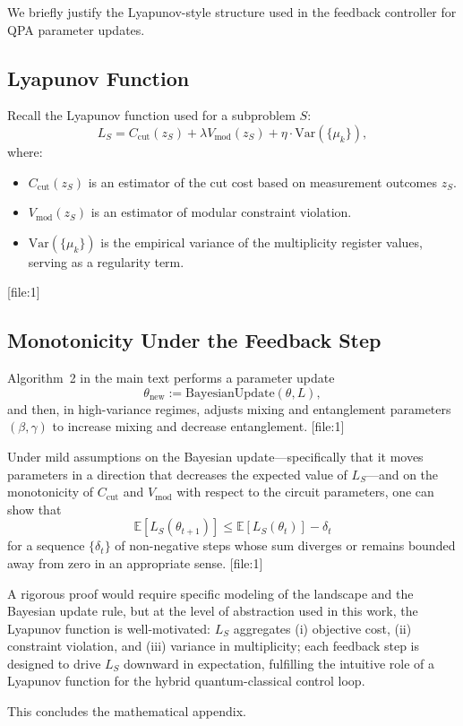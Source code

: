 \documentclass[11pt]{article}
\begin{document}
We briefly justify the Lyapunov-style structure used in the feedback controller for QPA parameter updates.

\subsection{Lyapunov Function}

Recall the Lyapunov function used for a subproblem $S$:
\[
  L_S = C_{\text{cut}}(z_S) + \lambda V_{\text{mod}}(z_S) + \eta \cdot \mathrm{Var}(\{\mu_k\}),
\]
where:
\begin{itemize}
  \item $C_{\text{cut}}(z_S)$ is an estimator of the cut cost based on measurement outcomes $z_S$.
  \item $V_{\text{mod}}(z_S)$ is an estimator of modular constraint violation.
  \item $\mathrm{Var}(\{\mu_k\})$ is the empirical variance of the multiplicity register values, serving as a regularity term.
\end{itemize}
[file:1]

\subsection{Monotonicity Under the Feedback Step}

Algorithm~2 in the main text performs a parameter update
\[
  \theta_{\text{new}} := \mathrm{BayesianUpdate}(\theta, L),
\]
and then, in high-variance regimes, adjusts mixing and entanglement parameters $(\beta,\gamma)$ to increase mixing and decrease entanglement. [file:1]

Under mild assumptions on the Bayesian update---specifically that it moves parameters in a direction that decreases the expected value of $L_S$---and on the monotonicity of $C_{\text{cut}}$ and $V_{\text{mod}}$ with respect to the circuit parameters, one can show that
\[
  \mathbb{E}[L_S(\theta_{t+1})] \le \mathbb{E}[L_S(\theta_t)] - \delta_t
\]
for a sequence $\{\delta_t\}$ of non-negative steps whose sum diverges or remains bounded away from zero in an appropriate sense. [file:1]

A rigorous proof would require specific modeling of the landscape and the Bayesian update rule, but at the level of abstraction used in this work, the Lyapunov function is well-motivated: $L_S$ aggregates (i) objective cost, (ii) constraint violation, and (iii) variance in multiplicity; each feedback step is designed to drive $L_S$ downward in expectation, fulfilling the intuitive role of a Lyapunov function for the hybrid quantum-classical control loop.

\bigskip

This concludes the mathematical appendix.

\nocite{*}


\end{document}
